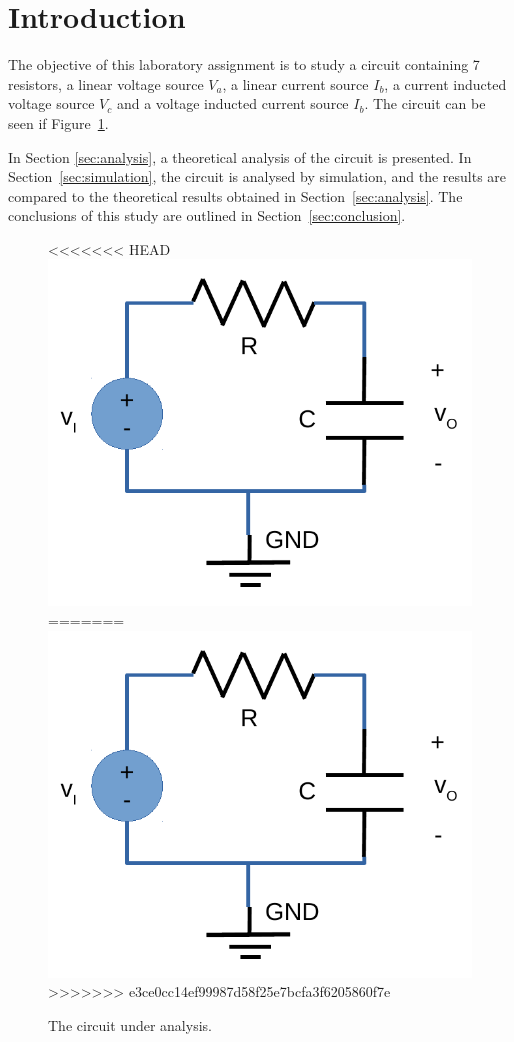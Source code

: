\section{Introduction}
\label{sec:introduction}

The objective of this laboratory assignment is to study a circuit containing 7 resistors, a linear voltage source $V_a$, a linear current source $I_b$, a current inducted voltage source $V_c$ and a voltage inducted current source $I_b$. The circuit can be seen if Figure~\ref{fig:rc}.


In Section \ref{sec:analysis}, a theoretical analysis of the circuit is
presented. In Section~\ref{sec:simulation}, the circuit is analysed by
simulation, and the results are compared to the theoretical results obtained in
Section~\ref{sec:analysis}. The conclusions of this study are outlined in
Section~\ref{sec:conclusion}.



\begin{figure}[h] \centering
<<<<<<< HEAD
\includegraphics[width=0.5\linewidth]{rc.pdf}
=======
\includegraphics[width=0.6\linewidth]{rc.pdf}
>>>>>>> e3ce0cc14ef99987d58f25e7bcfa3f6205860f7e
\caption{The circuit under analysis.}
\label{fig:rc}
\end{figure}

